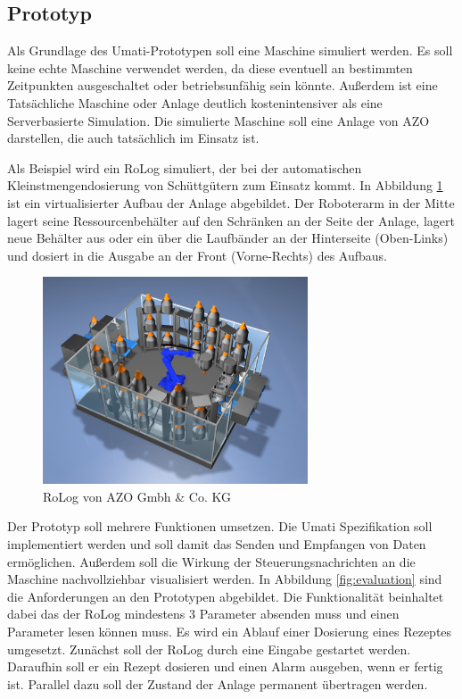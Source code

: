 \documentclass[a4paper, 12pt, oneside]{scrbook}
\begin{document}
		
		\subsection{Prototyp}
		Als Grundlage des Umati-Prototypen soll eine Maschine simuliert werden. Es soll keine echte Maschine verwendet werden, da diese eventuell an bestimmten Zeitpunkten ausgeschaltet oder betriebsunfähig sein könnte. Außerdem ist eine Tatsächliche Maschine oder Anlage deutlich kostenintensiver als eine Serverbasierte Simulation. Die simulierte Maschine soll eine Anlage von AZO darstellen, die auch tatsächlich im Einsatz ist. %
		
		Als Beispiel wird ein RoLog simuliert, der bei der automatischen Kleinstmengendosierung von Schüttgütern zum Einsatz kommt. In Abbildung \ref{fig:RoLog} ist ein virtualisierter Aufbau der Anlage abgebildet. Der Roboterarm in der Mitte lagert seine Ressourcenbehälter auf den Schränken an der Seite der Anlage, lagert neue Behälter aus oder ein über die Laufbänder an der Hinterseite (Oben-Links) und dosiert in die Ausgabe an der Front (Vorne-Rechts) des Aufbaus. \cite{noauthor_azo_nodate}
		
		\begin{figure}[H]
			\centering
			\includegraphics[width=0.7\textwidth]{res/RoLog.png}
			\caption{RoLog von AZO Gmbh \& Co. KG \cite{noauthor_azo_nodate}}
			\label{fig:RoLog}
		\end{figure}
		
		Der Prototyp soll mehrere Funktionen umsetzen. Die Umati Spezifikation soll implementiert werden und soll damit das Senden und Empfangen von Daten ermöglichen. Außerdem soll die Wirkung der Steuerungsnachrichten an die Maschine nachvollziehbar visualisiert werden. In Abbildung \ref{fig:evaluation} sind die Anforderungen an den Prototypen abgebildet. Die Funktionalität beinhaltet dabei das der RoLog mindestens 3 Parameter absenden muss und einen Parameter lesen können muss. Es wird ein Ablauf einer Dosierung eines Rezeptes umgesetzt. Zunächst soll der RoLog durch eine Eingabe gestartet werden. Daraufhin soll er ein Rezept dosieren und einen Alarm ausgeben, wenn er fertig ist. Parallel dazu soll der Zustand der Anlage permanent übertragen werden. %
		
\end{document}
